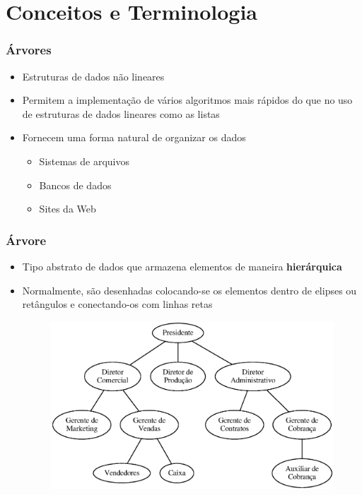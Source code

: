 \documentclass[aspectratio=169]{beamer}
\begin{document}
\section{Conceitos e Terminologia}

\begin{frame}\frametitle{Árvores}
\begin{itemize}
	\item Estruturas de dados não lineares
	\item Permitem a implementação de vários algoritmos mais rápidos do que no uso de estruturas de dados lineares como as listas
	\item Fornecem uma forma natural de organizar os dados
	\begin{itemize}
		\item Sistemas de arquivos
		\item Bancos de dados
		\item Sites da Web
	\end{itemize}
\end{itemize}
\end{frame}

\begin{frame}\frametitle{Árvore}
\begin{itemize}
	\item Tipo abstrato de dados que armazena elementos de maneira \textbf{hierárquica}
	\item Normalmente, são desenhadas colocando-se os elementos dentro de elipses ou retângulos e conectando-os com linhas retas
\begin{figure}[h]
	\centering
	\includegraphics[height=0.55\paperheight]{imagens/arvore1.eps}
\end{figure}
\end{itemize}
\end{frame}
\end{document}
